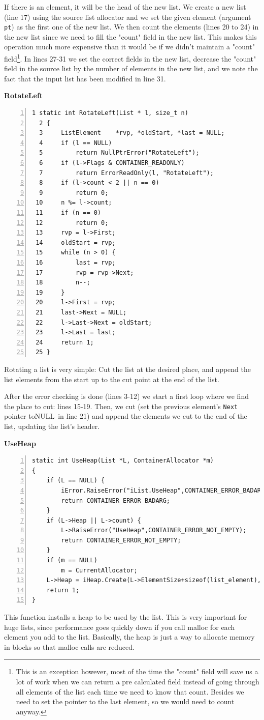 \documentclass[12pt,a4paper]{memoir} %
\newif\iftth
\newcommand{\container}{}
\newcommand{\function}[1] {%
\vspace{0.2in}
\par\noindent
\textbf{#1}\index{#1!code for \container} \hrulefill
\iftth\else
\nopagebreak
\fi
\noindent\begin{Verbatim}[numbers=left, xleftmargin=7mm]}
\newcommand{\Null}{{\iftth \ NULL \else \footnotesize NULL\  \fi}}
\begin{document}
{{If there is an element, it will be the head of the new list. We create a new list (line 17) using the source list allocator
and we set the given element (argument \verb,pt,) as the first one of the new 
list. We then count the elements (lines 20 to 24) in the new list
since we need to fill the "count" field in the new list. This makes this operation much more expensive than it would be
if we didn't maintain a "count" field\footnote{This is an exception however, most of the time the "count" field will save us a lot of work when we can
return a pre calculated field instead of going through all elements of the list each time we need to know that count. Besides we need to 
set the pointer to the last element, so we would need to count anyway.}.
In lines 27-31 we set the correct fields in the new list, decrease the "count" field in the source list by the number of elements in the new list,
and we note the fact that the input list has been modified in line 31.
\function{RotateLeft}
  1 static int RotateLeft(List * l, size_t n)
  2 {
  3     ListElement    *rvp, *oldStart, *last = NULL;
  4     if (l == NULL)
  5         return NullPtrError("RotateLeft");
  6     if (l->Flags & CONTAINER_READONLY)
  7         return ErrorReadOnly(l, "RotateLeft");
  8     if (l->count < 2 || n == 0)
  9         return 0;
 10     n %= l->count;
 11     if (n == 0)
 12         return 0;
 13     rvp = l->First;
 14     oldStart = rvp;
 15     while (n > 0) {
 16         last = rvp;
 17         rvp = rvp->Next;
 18         n--;
 19     }
 20     l->First = rvp;
 21     last->Next = NULL;
 22     l->Last->Next = oldStart;
 23     l->Last = last;
 24     return 1;
 25 }
\end{Verbatim}

Rotating a list is very simple: Cut the list at the desired place, and append the list elements from the start up to the cut point at the 
end of the list. 

After the error checking is done (lines 3-12) we start
a first loop where we find the place to cut: lines 15-19.
Then, we cut (set the previous element's \verb,Next, pointer to\Null in line 21) and append the
elements we cut to the end of the list, updating the list's header.

\function{UseHeap}
static int UseHeap(List *L, ContainerAllocator *m)
{
    if (L == NULL) {
        iError.RaiseError("iList.UseHeap",CONTAINER_ERROR_BADARG);
        return CONTAINER_ERROR_BADARG;
    }
    if (L->Heap || L->count) {
        L->RaiseError("UseHeap",CONTAINER_ERROR_NOT_EMPTY);
        return CONTAINER_ERROR_NOT_EMPTY;
    }
    if (m == NULL)
        m = CurrentAllocator;
    L->Heap = iHeap.Create(L->ElementSize+sizeof(list_element), m);
    return 1;
}
\end{Verbatim}
This function installs a heap to be used by the list. This is very important for huge lists, since performance goes quickly down if you call malloc 
for each element you add to the list. Basically, the heap is just a way to allocate memory in blocks so that malloc calls are reduced.
}}
\end{document}
